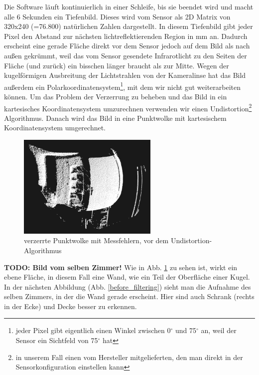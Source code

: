 \documentclass[a4paper,12pt,ngerman]{scrartcl}
\begin{document}
Die Software läuft kontinuierlich in einer Schleife, bis sie beendet wird und macht alle 6 Sekunden ein 
Tiefenbild. Dieses wird vom Sensor als 2D Matrix von 320x240 (=76.800) natürlichen Zahlen dargestellt.
In diesem Tiefenbild gibt jeder Pixel den Abstand zur nächsten lichtreflektierenden Region in mm an. 
Dadurch erscheint eine gerade Fläche direkt vor dem Sensor jedoch auf dem Bild als nach außen gekrümmt, 
weil das vom Sensor gesendete Infrarotlicht zu den Seiten der Fläche (und zurück) ein bisschen länger
braucht als zur Mitte. Wegen der kugelförmigen Ausbreitung der Lichtstrahlen von der Kameralinse hat das
Bild außerdem ein Polarkoordinatensystem\footnote{jeder Pixel gibt eigentlich einen Winkel zwischen
	0$^{\circ}$ und 75$^{\circ}$ an, weil der Sensor ein Sichtfeld von 75$^{\circ}$ hat}, mit dem wir nicht
gut weiterarbeiten können. Um das Problem der Verzerrung zu beheben und das Bild in ein kartesisches
Koordinatensystem umzurechnen verwenden wir einen Undistortion\footnote{in unserem Fall einen
	vom Hersteller mitgelieferten, den man direkt in der Sensorkonfiguration einstellen kann} Algorithmus. Danach wird das Bild in eine Punktwolke mit kartesischem Koordinatensystem umgerechnet.\par
\begin{figure}[h]
	\centering
	\includegraphics[width=0.6\textwidth]{distorted_pointcloud}
	\caption{verzerrte Punktwolke mit Messfehlern, vor dem Undistortion-Algorithmus}
	\label{distorted_pointcloud_img}
\end{figure}
\textbf{TODO: Bild vom selben Zimmer!}
Wie in Abb. \ref{distorted_pointcloud_img} zu sehen ist, wirkt ein ebene Fläche, in diesem Fall 
eine Wand, wie ein Teil der Oberfläche einer Kugel. In der nächsten Abbildung (Abb. \ref{before_filtering}) sieht
man die Aufnahme des selben Zimmers, in der die Wand gerade erscheint. Hier sind auch
Schrank (rechts in der Ecke) und Decke besser zu erkennen. 
\end{document}
